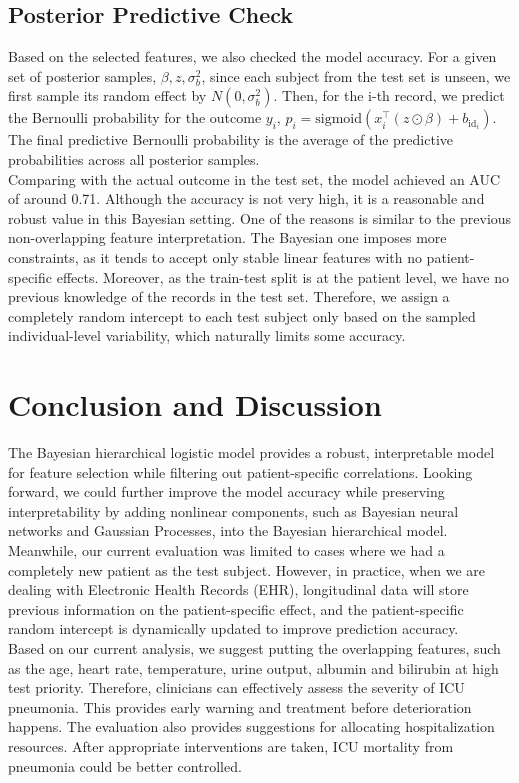 \documentclass[10pt,a4paper]{article}
\begin{document}
\subsection{Posterior Predictive Check}
Based on the selected features, we also checked the model accuracy. For a given set of posterior samples, $\beta, z, \sigma_b^2$, since each subject from the test set is unseen, we first sample its random effect by $N(0, \sigma_b^2)$. Then, for the i-th record, we predict the Bernoulli probability for the outcome $y_i$, $p_i = \text{sigmoid}(x_i^\top (z\odot \beta) + b_{\mathrm{id}_i})$. The final predictive Bernoulli probability is the average of the predictive probabilities across all posterior samples.\\
Comparing with the actual outcome in the test set, the model achieved an AUC of around 0.71. Although the accuracy is not very high, it is a reasonable and robust value in this Bayesian setting. One of the reasons is similar to the previous non-overlapping feature interpretation. The Bayesian one imposes more constraints, as it tends to accept only stable linear features with no patient-specific effects. Moreover, as the train-test split is at the patient level, we have no previous knowledge of the records in the test set. Therefore, we assign a completely random intercept to each test subject only based on the sampled individual-level variability, which naturally limits some accuracy.
\section{Conclusion and Discussion}













The Bayesian hierarchical logistic model provides a robust, interpretable model for feature selection while filtering out patient-specific correlations. Looking forward, we could further improve the model accuracy while preserving interpretability by adding nonlinear components, such as Bayesian neural networks and Gaussian Processes, into the Bayesian hierarchical model. Meanwhile, our current evaluation was limited to cases where we had a completely new patient as the test subject. However, in practice, when we are dealing with Electronic Health Records (EHR), longitudinal data will store previous information on the patient-specific effect, and the patient-specific random intercept is dynamically updated to improve prediction accuracy.\\
Based on our current analysis, we suggest putting the overlapping features, such as the age, heart rate, temperature, urine output, albumin and bilirubin at high test priority. Therefore, clinicians can effectively assess the severity of ICU pneumonia. This provides early warning and treatment before deterioration happens. The evaluation also provides suggestions for allocating hospitalization resources. After appropriate interventions are taken, ICU mortality from pneumonia could be better controlled.
\end{document}
